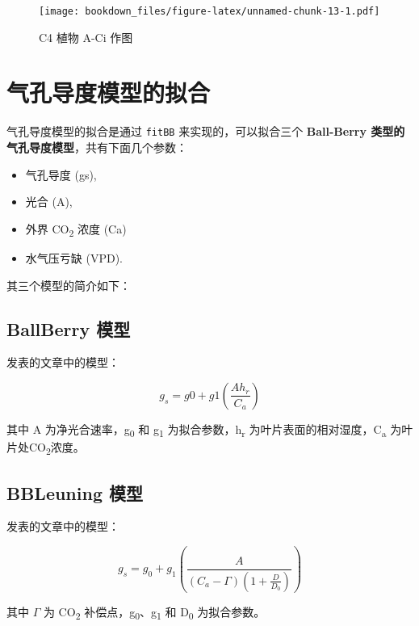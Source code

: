 \documentclass[]{krantz}
\providecommand{\tightlist}{%
  \setlength{\itemsep}{0pt}\setlength{\parskip}{0pt}}
\theoremstyle{definition}
\theoremstyle{definition}
\theoremstyle{definition}
\theoremstyle{remark}
\begin{document}
\begin{figure}
\centering
\texttt{[image: bookdown\_files/figure-latex/unnamed-chunk-13-1.pdf]}
\caption{\label{fig:unnamed-chunk-13}C4 植物 A-Ci 作图}
\end{figure}

\cleardoublepage

\chapter{气孔导度模型的拟合}\label{stomotal_sim}

气孔导度模型的拟合是通过 \texttt{fitBB} 来实现的，可以拟合三个
\textbf{Ball-Berry 类型的气孔导度模型}，共有下面几个参数：

\begin{itemize}
\tightlist
\item
  气孔导度 (gs),
\item
  光合 (A),
\item
  外界 CO\textsubscript{2} 浓度 (Ca)
\item
  水气压亏缺 (VPD).
\end{itemize}

其三个模型的简介如下：

\section{BallBerry 模型}\label{ballberry}

\citet{Ball1987A} 发表的文章中的模型：

\begin{equation}
g_s = g0 + g1(\frac{A h_r}{C_a})
\label{eq:ballberry}
\end{equation}

其中 A 为净光合速率，g\textsubscript{0} 和 g\textsubscript{1}
为拟合参数，h\textsubscript{r} 为叶片表面的相对湿度，C\textsubscript{a}
为叶片处CO\textsubscript{2}浓度。

\section{BBLeuning 模型}\label{bbleuning}

\citet{leuning1995a} 发表的文章中的模型：

\begin{equation}
g_s = g_0 + g_1(\frac{A}{(C_a - \Gamma)(1 + \frac{D}{D_0})})
\label{eq:BBLeuning}
\end{equation}

其中 \(\Gamma\) 为 CO\textsubscript{2}
补偿点，g\textsubscript{0}、g\textsubscript{1} 和 D\textsubscript{0}
为拟合参数。
\end{document}

